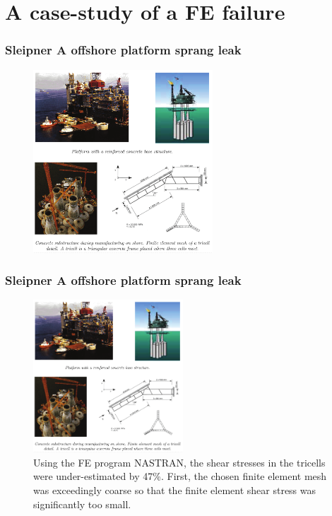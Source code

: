 \documentclass[handout]{beamer}
\begin{document}

\section{A case-study of a FE failure}
\begin{frame}
\frametitle{Sleipner A offshore platform sprang leak}
	\begin{figure}
	\centering
	\includegraphics[width=0.6\textwidth]{figs/sleipner.png}
\end{figure}
\end{frame}

\begin{frame}
\frametitle{Sleipner A offshore platform sprang leak}
\begin{figure}
	\centering
	\includegraphics[width=0.5\textwidth]{figs/sleipner.png}
	\caption*{Using the FE program NASTRAN, the shear stresses in the tricells were under-estimated by 47\%. First, the chosen finite element mesh was exceedingly coarse so that the finite element shear stress was significantly too small.}
\end{figure}
\end{frame}
\end{document}
